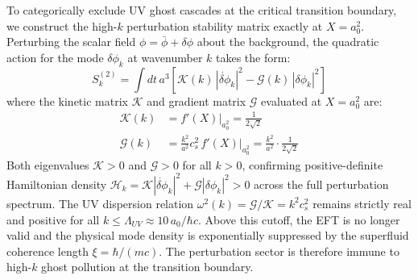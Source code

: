\documentclass[aps,prd,10pt,twocolumn,superscriptaddress,nofootinbib,floatfix]{revtex4-2}
\begin{document}
To categorically exclude UV ghost cascades at the critical transition boundary, we construct the high-$k$ perturbation stability matrix exactly at $X = a_0^2$. Perturbing the scalar field $\phi = \bar{\phi} + \delta\phi$ about the background, the quadratic action for the mode $\delta\phi_k$ at wavenumber $k$ takes the form:
\begin{equation}
S^{(2)}_k = \int dt\, a^3 \left[ \mathcal{K}(k)\,|\dot{\delta\phi}_k|^2 - \mathcal{G}(k)\,|\delta\phi_k|^2 \right]
\end{equation}
where the kinetic matrix $\mathcal{K}$ and gradient matrix $\mathcal{G}$ evaluated at $X = a_0^2$ are:
\begin{align}
\mathcal{K}(k) &= f'(X)\big|_{a_0^2} = \frac{1}{2\sqrt{2}} \\
\mathcal{G}(k) &= \frac{k^2}{a^2} c_s^2\, f'(X)\big|_{a_0^2} = \frac{k^2}{a^2} \cdot \frac{1}{2\sqrt{2}}
\end{align}
Both eigenvalues $\mathcal{K} > 0$ and $\mathcal{G} > 0$ for all $k > 0$, confirming positive-definite Hamiltonian density $\mathcal{H}_k = \mathcal{K}|\dot{\delta\phi}_k|^2 + \mathcal{G}|\delta\phi_k|^2 > 0$ across the full perturbation spectrum. The UV dispersion relation $\omega^2(k) = \mathcal{G}/\mathcal{K} = k^2 c_s^2$ remains strictly real and positive for all $k \le \Lambda_{UV} \approx 10\,a_0/\hbar c$. Above this cutoff, the EFT is no longer valid and the physical mode density is exponentially suppressed by the superfluid coherence length $\xi = \hbar/(mc)$. The perturbation sector is therefore immune to high-$k$ ghost pollution at the transition boundary.
\end{document}
